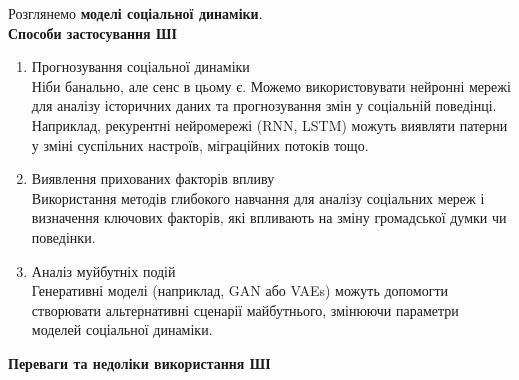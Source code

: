 \documentclass[a4paper,12pt]{article}
\begin{document}
\newpage
\noindent
    Розглянемо \textbf{моделі соціальної динаміки}. \\
    \textbf{Способи застосування ШІ}
    \begin{enumerate}
        \item Прогнозування соціальної динаміки \\
        Ніби банально, але сенс в цьому є. Можемо використовувати нейронні мережі для аналізу історичних даних та прогнозування змін у соціальній поведінці. Наприклад, рекурентні нейромережі (RNN, LSTM) можуть виявляти патерни у зміні суспільних настроїв, міграційних потоків тощо.
        
        \item Виявлення прихованих факторів впливу \\
        Використання методів глибокого навчання для аналізу соціальних мереж і визначення ключових факторів, які впливають на зміну громадської думки чи поведінки.
        
        \item Аналіз муйбутніх подій \\
        Генеративні моделі (наприклад, GAN або VAEs) можуть допомогти створювати альтернативні сценарії майбутнього, змінюючи параметри моделей соціальної динаміки.
    \end{enumerate}
    \textbf{Переваги та недоліки використання ШІ}
\end{document}
